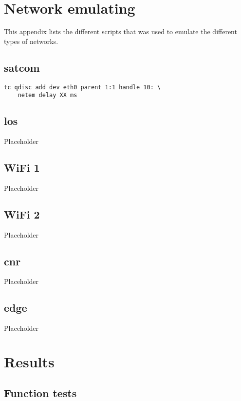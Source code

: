 \begin{appendices}

\chapter{Network emulating}

\label{appendix-netem-scripts}

This appendix lists the different scripts that was used to emulate the different
types of networks.

\section{\gls{satcom}}

\begin{lstlisting}[frame=single, caption="Emulating SATCOM", label=listing-netem-delay]
  tc qdisc add dev eth0 parent 1:1 handle 10: \
    netem delay XX ms
\end{lstlisting}

\section{\gls{los}}
Placeholder

\section{WiFi 1}
Placeholder

\section{WiFi 2}
Placeholder

\section{\gls{cnr}}
Placeholder

\section{\gls{edge}}
Placeholder



\chapter{Results}

\section{Function tests}


\end{appendices}
